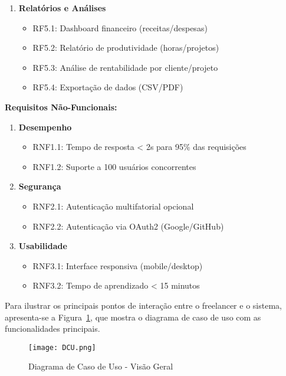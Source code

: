\documentclass[a4paper,12pt]{article}
\begin{document}
\begin{enumerate}[label=\textbf{RF\arabic*}, leftmargin=2.5cm]
  \item \textbf{Relatórios e Análises}
    \begin{itemize}[nosep]
      \item RF5.1: Dashboard financeiro (receitas/despesas)
      \item RF5.2: Relatório de produtividade (horas/projetos)
      \item RF5.3: Análise de rentabilidade por cliente/projeto
      \item RF5.4: Exportação de dados (CSV/PDF)
    \end{itemize}
\end{enumerate}

\textbf{Requisitos Não-Funcionais:}
\begin{enumerate}[label=\textbf{RNF\arabic*}, leftmargin=2.5cm]
  \item \textbf{Desempenho}
    \begin{itemize}[nosep]
      \item RNF1.1: Tempo de resposta < 2s para 95\% das requisições
      \item RNF1.2: Suporte a 100 usuários concorrentes
    \end{itemize}
  
  \item \textbf{Segurança}
    \begin{itemize}[nosep]
      \item RNF2.1: Autenticação multifatorial opcional
      \item RNF2.2: Autenticação via OAuth2 (Google/GitHub)
    \end{itemize}
  
  \item \textbf{Usabilidade}
    \begin{itemize}[nosep]
      \item RNF3.1: Interface responsiva (mobile/desktop)
      \item RNF3.2: Tempo de aprendizado < 15 minutos
    \end{itemize}
  
\end{enumerate}

Para ilustrar os principais pontos de interação entre o freelancer e o sistema, apresenta-se a Figura~\ref{fig:caso-uso}, que mostra o diagrama de caso de uso com as funcionalidades principais.

\begin{figure}[H]
  \centering
  \texttt{[image: DCU.png]}
  \caption{Diagrama de Caso de Uso - Visão Geral}
  \label{fig:caso-uso}
\end{figure}
\end{document}
